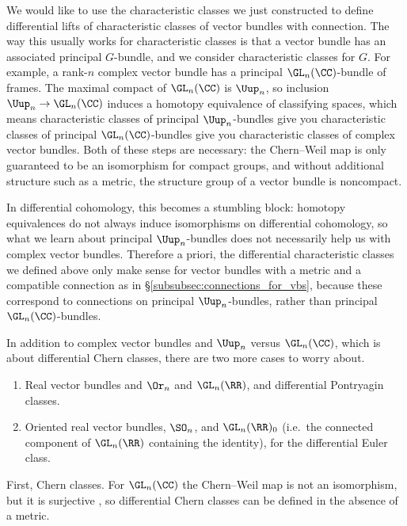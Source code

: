 \begin{remark}
\label{metric_differential_cc}
	We would like to use the characteristic classes we just constructed to define differential lifts of characteristic
	classes of vector bundles with connection. The way this usually works for characteristic classes is that a vector
	bundle has an associated principal $G$-bundle, and we consider characteristic classes for $G$. For example, a
	rank-$n$ complex vector bundle has a principal $\GL_n( \CC)$-bundle of frames. The maximal compact of $\GL_n( \CC)$
	is $\Uup_n$, so inclusion $\Uup_n\to\GL_n( \CC)$ induces a homotopy equivalence of classifying spaces, which
	means characteristic classes of principal $\Uup_n$-bundles give you characteristic classes of principal $\GL_n(
	\CC)$-bundles give you characteristic classes of complex vector bundles. Both of these steps are necessary: the
	Chern--Weil map is only guaranteed to be an isomorphism for compact groups, and without additional structure such
	as a metric, the structure group of a vector bundle is noncompact.

	In differential cohomology, this becomes a stumbling block: homotopy equivalences do not always induce isomorphisms
	on differential cohomology, so what we learn about principal $\Uup_n$-bundles does not necessarily help us with
	complex vector bundles. Therefore a priori, the differential characteristic classes we defined above only make
	sense for vector bundles with a metric and a compatible connection as in \S\ref{subsubsec:connections_for_vbs},
	because these correspond to connections on principal $\Uup_n$-bundles, rather than principal $\GL_n(
	\CC)$-bundles.

	In addition to complex vector bundles and $\Uup_n$ versus $\GL_n( \CC)$, which is about differential Chern
	classes, there are two more cases to worry about.
	\begin{enumerate}[(1)]
		\item Real vector bundles and $\Or_n$ and $\GL_n( \RR)$, and differential Pontryagin classes.
		
		\item Oriented real vector bundles, $\SO_n$, and $\GL_n( \RR)_0$ (i.e.\ the connected component of $\GL_n(
		\RR)$ containing the identity), for the differential Euler class.
	\end{enumerate}
	First, Chern classes. For $\GL_n( \CC)$ the Chern--Weil map is not an isomorphism, but it is surjective \cites[\S
	4]{MR827262}[\S 11.8.1]{Pro07}, so differential Chern classes can be defined in the absence of a metric.


\end{remark}
